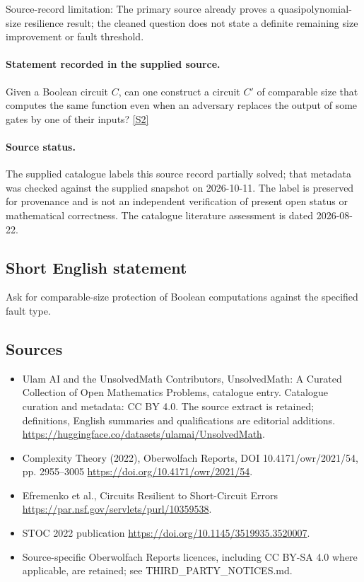 \documentclass[11pt]{article}
\begin{document}
Source-record limitation: The primary source already proves a quasipolynomial-size resilience result; the cleaned question does not state a definite remaining size improvement or fault threshold.
\paragraph{Statement recorded in the supplied source.}
Given a Boolean circuit $C$, can one construct a circuit $C'$ of comparable size that computes the same function even when an adversary replaces the output of some gates by one of their inputs? \href{https://doi.org/10.4171/owr/2021/54}{[S2]}
\paragraph{Source status.}
The supplied catalogue labels this source record partially solved; that metadata was checked against the supplied snapshot on 2026-10-11. The label is preserved for provenance and is not an independent verification of present open status or mathematical correctness. The catalogue literature assessment is dated 2026-08-22.
\subsection{Short English statement}
Ask for comparable-size protection of Boolean computations against the specified fault type.
\subsection{Sources}
\begin{itemize}
\item[S1] Ulam AI and the UnsolvedMath Contributors, UnsolvedMath: A Curated Collection of Open Mathematics Problems, catalogue entry. Catalogue curation and metadata: CC BY 4.0. The source extract is retained; definitions, English summaries and qualifications are editorial additions.
\url{https://huggingface.co/datasets/ulamai/UnsolvedMath}.
\item[S2] Complexity Theory (2022), Oberwolfach Reports, DOI 10.4171/owr/2021/54, pp. 2955--3005
\url{https://doi.org/10.4171/owr/2021/54}.
\item[S3] Efremenko et al., Circuits Resilient to Short-Circuit Errors
\url{https://par.nsf.gov/servlets/purl/10359538}.
\item[S4] STOC 2022 publication
\url{https://doi.org/10.1145/3519935.3520007}.
\item Source-specific Oberwolfach Reports licences, including CC BY-SA 4.0 where applicable, are retained; see THIRD\_PARTY\_NOTICES.md.
\end{itemize}
\end{document}
